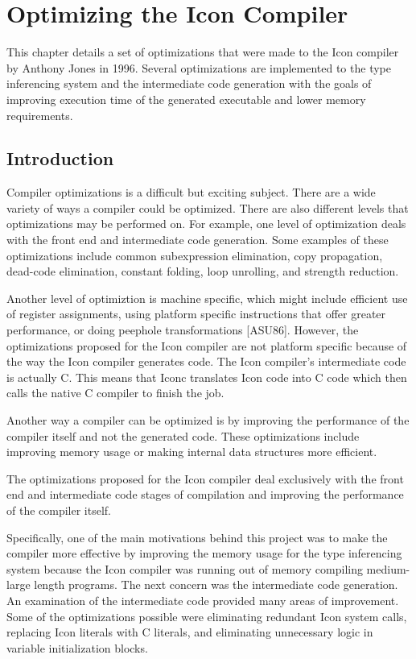 \clearpage\chapter{Optimizing the Icon Compiler}

This chapter details a set of optimizations that were made to the Icon
compiler by Anthony Jones in 1996. Several optimizations are
implemented to the type inferencing system and the intermediate code
generation with the goals of improving execution time of the generated
executable and lower memory requirements.

\section{Introduction}

Compiler optimizations is a difficult but exciting subject. There are
a wide variety of ways a compiler could be optimized. There are also
different levels that optimizations may be performed on. For example,
one level of optimization deals with the front end and intermediate
code generation. Some examples of these optimizations include common
subexpression elimination, copy propagation, dead-code elimination,
constant folding, loop unrolling, and strength reduction.

Another level of optimiztion is machine specific, which might include
efficient use of register assignments, using platform specific
instructions that offer greater performance, or doing peephole
transformations [ASU86]. However, the optimizations proposed for the
Icon compiler are not platform specific because of the way the Icon
compiler generates code. The Icon compiler's intermediate code is
actually C. This means that Iconc translates Icon code into C code
which then calls the native C compiler to finish the job.

Another way a compiler can be optimized is by improving the
performance of the compiler itself and not the generated code. These
optimizations include improving memory usage or making internal data
structures more efficient.

The optimizations proposed for the Icon compiler deal exclusively with
the front end and intermediate code stages of compilation and
improving the performance of the compiler itself.

Specifically, one of the main motivations behind this project was to
make the compiler more effective by improving the memory usage for the
type inferencing system because the Icon compiler was running out of
memory compiling medium-large length programs. The next concern was
the intermediate code generation. An examination of the intermediate
code provided many areas of improvement. Some of the optimizations
possible were eliminating redundant Icon system calls, replacing Icon
literals with C literals, and eliminating unnecessary logic in
variable initialization blocks.

